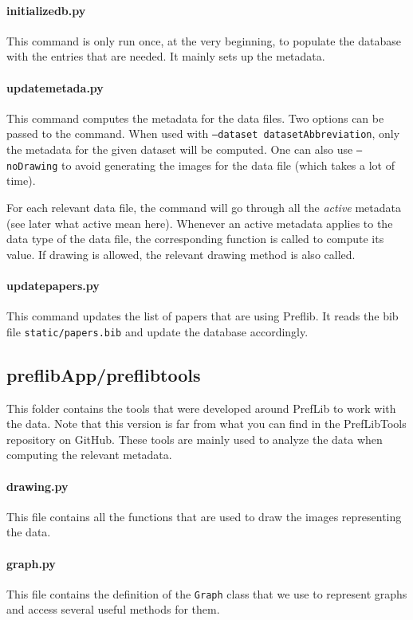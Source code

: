 \documentclass{report}
\begin{document}
	\paragraph*{\faFileO{} initializedb.py} This command is only run once, at the very beginning, to populate the database with the entries that are needed. It mainly sets up the metadata.
	
	\paragraph*{\faFileO{} updatemetada.py} This command computes the metadata for the data files. Two options can be passed to the command. When used with \texttt{--dataset datasetAbbreviation}, only the metadata for the given dataset will be computed. One can also use \texttt{--noDrawing} to avoid generating the images for the data file (which takes a lot of time).
	
	For each relevant data file, the command will go through all the \emph{active} metadata (see later what active mean here). Whenever an active metadata applies to the data type of the data file, the corresponding function is called to compute its value. If drawing is allowed, the relevant drawing method is also called.
	
	\paragraph*{\faFileO{} updatepapers.py} This command updates the list of papers that are using Preflib. It reads the bib file \texttt{static/papers.bib} and update the database accordingly.
	
	\subsection*{\faFolderO{} preflibApp/preflibtools} This folder contains the tools that were developed around PrefLib to work with the data. Note that this version is far from what you can find in the PrefLibTools repository on GitHub. These tools are mainly used to analyze the data when computing the relevant metadata.
	
	\paragraph*{\faFileO{} drawing.py} This file contains all the functions that are used to draw the images representing the data. 
	
	\paragraph*{\faFileO{} graph.py} This file contains the definition of the \texttt{Graph} class that we use to represent graphs and access several useful methods for them.
	
\end{document}
